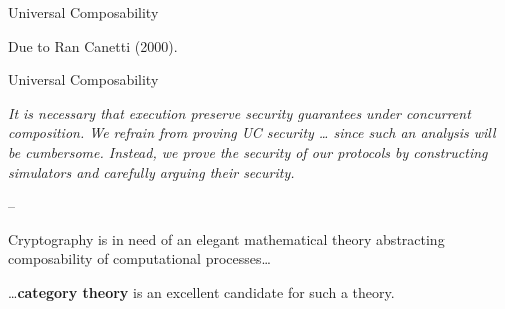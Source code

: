 \documentclass{beamer}
\def\laptop{\pgftext{}}
\def\bank{\pgftext{}}
\begin{document}
\begin{frame}{Universal Composability}
  \pause
  \begin{multicols}{2}
  Due to Ran Canetti (2000).


  \columnbreak

  \begin{figure}
    \centering
  \end{figure}
  \end{multicols}
\end{frame}

\begin{frame}{Universal Composability}
  \begin{center}
    \emph{
      It is necessary that execution preserve security guarantees under
      concurrent composition. We refrain from proving UC security \dots{} since
      such an analysis will be cumbersome. Instead, we prove the security of our
      protocols by constructing simulators and carefully arguing their security.
    }

    --\cite{david}
  \end{center}
\end{frame}

\begin{frame}[fragile]
	\parbox{5cm}{Cryptography is in need of an elegant mathematical theory abstracting
		composability of computational processes\dots}\pause
	\vfill
	\hfill\parbox{5cm}{\dots \textbf{category theory} is an excellent candidate
		for such a theory.}
\end{frame}
\end{document}
